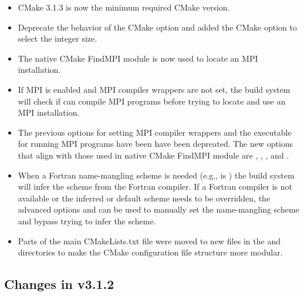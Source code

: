 \begin{itemize}
\item CMake 3.1.3 is now the minimum required CMake version.
\item Deprecate the behavior of the  CMake option and
  added the \newline
   CMake option to select the 
  integer size.
\item The native CMake FindMPI module is now used to locate an MPI installation.
\item If MPI is enabled and MPI compiler wrappers are not set, the build system
  will check if  can compile MPI programs before
  trying to locate and use an MPI installation.
\item The previous options for setting MPI compiler wrappers and the executable
  for running MPI programs have been have been depreated. The new options that
  align with those used in native CMake FindMPI module are
  , , ,
  and .
\item When a Fortran name-mangling scheme is needed (e.g., 
  is ) the build system will infer the scheme from the Fortran
  compiler. If a Fortran compiler is not available or the inferred or default
  scheme needs to be overridden, the advanced options
   and  can
  be used to manually set the name-mangling scheme and bypass trying to infer
  the scheme.
\item Parts of the main CMakeLists.txt file were moved to new files in the
   and  directories to make the CMake configuration file
  structure more modular.
\end{itemize}

\subsection*{Changes in v3.1.2}

